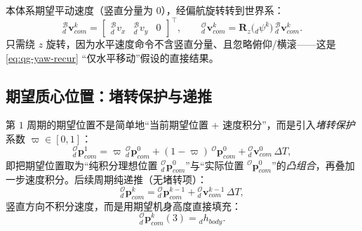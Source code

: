 本体系期望平动速度（竖直分量为 $0$），经偏航旋转转到世界系\cite{yu2021quadruped}：
\begin{equation}
  {}_d^{\mathcal{B}}\boldsymbol{v}_{com}^{k}=
  \begin{bmatrix} {}_d^{\mathcal{B}}v_x & {}_d^{\mathcal{B}}v_y & 0\end{bmatrix}^\top,
  \qquad
  {}_d^{\mathcal{O}}\boldsymbol{v}_{com}^{k}=\mathbf{R}_z\!\big({}_d\psi^{k}\big)\,{}_d^{\mathcal{B}}\boldsymbol{v}_{com}^{k}.
  \label{eq:qg-vel}
\end{equation}
只需绕 $z$ 旋转，因为水平速度命令不含竖直分量、且忽略俯仰/横滚——这是 \cref{eq:qg-yaw-recur} “仅水平移动”假设的直接结果。

\subsection{期望质心位置：堵转保护与递推}
\label{subsec:qg-pos}

第 $1$ 周期的期望位置不是简单地“当前期望位置 + 速度积分”，而是引入\emph{堵转保护}系数 $\varpi\in[0,1]$\cite{yu2021quadruped}：
\begin{equation}
  {}_d^{\mathcal{O}}\boldsymbol{p}_{com}^{1}=
  \varpi\,{}_d^{\mathcal{O}}\boldsymbol{p}_{com}^{0}
  +(1-\varpi)\,{}^{\mathcal{O}}\boldsymbol{p}_{com}^{0}
  +{}_d^{\mathcal{O}}\boldsymbol{v}_{com}^{0}\,\Delta T,
  \label{eq:qg-pos1}
\end{equation}
即把期望位置取为“纯积分理想位置 ${}_d^{\mathcal{O}}\boldsymbol{p}_{com}^{0}$”与“实际位置 ${}^{\mathcal{O}}\boldsymbol{p}_{com}^{0}$”的\emph{凸组合}，再叠加一步速度积分。后续周期纯递推（无堵转项）\cite{yu2021quadruped}：
\begin{equation}
  {}_d^{\mathcal{O}}\boldsymbol{p}_{com}^{k}={}_d^{\mathcal{O}}\boldsymbol{p}_{com}^{k-1}+{}_d^{\mathcal{O}}\boldsymbol{v}_{com}^{k-1}\,\Delta T,
  \label{eq:qg-posk}
\end{equation}
竖直方向不积分速度，而是用期望机身高度直接填充\cite{yu2021quadruped}：
\begin{equation}
  {}_d^{\mathcal{O}}\boldsymbol{p}_{com}^{k}(3)={}_dh_{body}.
  \label{eq:qg-posz}
\end{equation}

